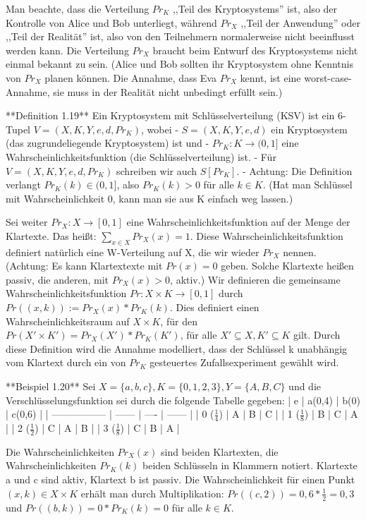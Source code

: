 \documentclass[a4paper]{article}
\begin{document}
\begin{multicols}{3}
Man beachte, dass die Verteilung $Pr_K$ ,,Teil des Kryptosystems'' ist, also der Kontrolle von Alice und Bob unterliegt, während $Pr_X$ ,,Teil der Anwendung'' oder ,,Teil der Realität'' ist, also von den Teilnehmern normalerweise nicht beeinflusst werden kann. Die Verteilung $Pr_X$ braucht beim Entwurf des Kryptosystems nicht einmal bekannt zu sein. (Alice und Bob sollten ihr Kryptosystem ohne Kenntnis von $Pr_X$ planen können. Die Annahme, dass Eva $Pr_X$ kennt, ist eine worst-case-Annahme, sie muss in der Realität nicht unbedingt erfüllt sein.)

**Definition 1.19** Ein Kryptosystem mit Schlüsselverteilung (KSV) ist ein 6-Tupel $V=(X,K,Y,e,d,Pr_K)$, wobei
- $S=(X,K,Y,e,d)$ ein Kryptosystem (das zugrundeliegende Kryptosystem) ist und
- $Pr_K:K\rightarrow (0,1]$ eine Wahrscheinlichkeitsfunktion (die Schlüsselverteilung) ist.
- Für $V=(X,K,Y,e,d,Pr_K)$ schreiben wir auch $S[Pr_K]$.
- Achtung: Die Definition verlangt $Pr_K(k)\in (0,1]$, also $Pr_K(k)> 0$ für alle $k\in K$. (Hat man Schlüssel mit Wahrscheinlichkeit 0, kann man sie aus K einfach weg lassen.)

Sei weiter $Pr_X:X\rightarrow [0,1]$ eine Wahrscheinlichkeitsfunktion auf der Menge der Klartexte. Das heißt: $\sum_{x\in X}Pr_X(x)=1$. Diese Wahrscheinlichkeitsfunktion definiert natürlich eine W-Verteilung auf X, die wir wieder $Pr_X$ nennen. (Achtung: Es kann Klartextexte mit $Pr(x)=0$ geben. Solche Klartexte heißen passiv, die anderen, mit $Pr_X(x)>0$, aktiv.) Wir definieren die gemeinsame Wahrscheinlichkeitsfunktion $Pr:X\times K\rightarrow [0,1]$ durch $Pr((x,k)):=Pr_X(x)*Pr_K(k)$.
Dies definiert einen Wahrscheinlichkeitsraum auf $X\times K$, für den $Pr(X′\times K′)=Pr_X(X′)*Pr_K(K′)$, für alle $X′\subseteq X,K′\subseteq K$ gilt. Durch diese Definition wird die Annahme modelliert, dass der Schlüssel k unabhängig vom Klartext durch ein von $Pr_K$ gesteuertes Zufallsexperiment gewählt wird.

**Beispiel 1.20** Sei $X=\{a,b,c\},K=\{0,1,2,3\},Y=\{A,B,C\}$ und die Verschlüsselungsfunktion sei durch die folgende Tabelle gegeben:
| e                 | a(0,4) | b(0) | c(0,6) |
| ----------------- | ------ | ---- | ------ |
| 0 ($\frac{1}{4}$) | A      | B    | C      |
| 1 ($\frac{1}{8}$) | B      | C    | A      |
| 2 ($\frac{1}{2}$) | C      | A    | B      |
| 3 ($\frac{1}{8}$) | C      | B    | A      |

Die Wahrscheinlichkeiten $Pr_X(x)$ sind beiden Klartexten, die Wahrscheinlichkeiten $Pr_K(k)$ beiden Schlüsseln in Klammern notiert. Klartexte a und c sind aktiv, Klartext b ist passiv. Die Wahrscheinlichkeit für einen Punkt $(x,k)\in X\times K$ erhält man durch Multiplikation: $Pr((c,2)) = 0,6 *\frac{1}{2}=0,3$ und $Pr((b,k))=0*Pr_K(k)=0$ für alle $k\in K$.


\end{multicols}
\end{document}
